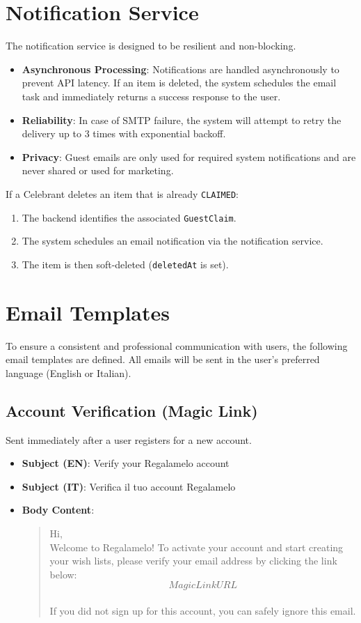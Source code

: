 \section{Notification Service}
The notification service is designed to be resilient and non-blocking.
\begin{itemize}
    \item \textbf{Asynchronous Processing}: Notifications are handled asynchronously to prevent API latency. If an item is deleted, the system schedules the email task and immediately returns a success response to the user.
    \item \textbf{Reliability}: In case of SMTP failure, the system will attempt to retry the delivery up to 3 times with exponential backoff.
    \item \textbf{Privacy}: Guest emails are only used for required system notifications and are never shared or used for marketing.
\end{itemize}

If a Celebrant deletes an item that is already \texttt{CLAIMED}:
\begin{enumerate}
    \item The backend identifies the associated \texttt{GuestClaim}.
    \item The system schedules an email notification via the notification service.
    \item The item is then soft-deleted (\texttt{deletedAt} is set).
\end{enumerate}

\section{Email Templates}
To ensure a consistent and professional communication with users, the following email templates are defined. All emails will be sent in the user's preferred language (English or Italian).

\subsection{Account Verification (Magic Link)}
Sent immediately after a user registers for a new account.
\begin{itemize}
    \item \textbf{Subject (EN)}: Verify your Regalamelo account
    \item \textbf{Subject (IT)}: Verifica il tuo account Regalamelo
    \item \textbf{Body Content}:
        \begin{quote}
            Hi, \\
            Welcome to Regalamelo! To activate your account and start creating your wish lists, please verify your email address by clicking the link below: \\
            \[Magic Link URL\] \\
            If you did not sign up for this account, you can safely ignore this email.
        \end{quote}
\end{itemize}

